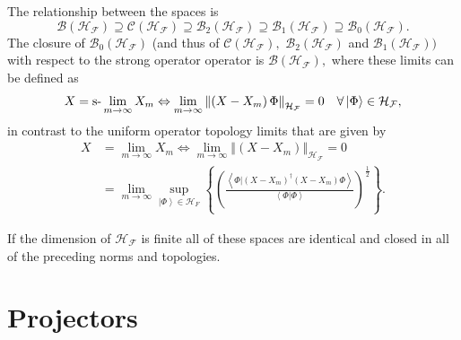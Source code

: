 \documentclass[aps,preprint]{revtex4}%
\begin{document}
The relationship between the spaces is
\begin{equation}
\mathcal{B}\left(  \mathcal{H}_{\mathcal{F}}\right)  \supseteq\mathcal{C}%
\left(  \mathcal{H}_{\mathcal{F}}\right)  \supseteq\mathcal{B}_{2}\left(
\mathcal{H}_{\mathcal{F}}\right)  \supseteq\mathcal{B}_{1}\left(
\mathcal{H}_{\mathcal{F}}\right)  \supseteq\mathcal{B}_{0}\left(
\mathcal{H}_{\mathcal{F}}\right)  .
\end{equation}
The closure of $\mathcal{B}_{0}\left(  \mathcal{H}_{\mathcal{F}}\right)  $
(and thus of $\mathcal{C}\left(  \mathcal{H}_{\mathcal{F}}\right)  ,$
$\mathcal{B}_{2}\left(  \mathcal{H}_{\mathcal{F}}\right)  $ and $\mathcal{B}%
_{1}\left(  \mathcal{H}_{\mathcal{F}}\right)  )$ with respect to the strong
operator operator is $\mathcal{B}\left(  \mathcal{H}_{\mathcal{F}}\right)  ,$
where these limits can be defined as
\begin{equation}
X=\text{\textrm{s-}}\lim_{m\rightarrow\infty}X_{m}\Leftrightarrow
\lim_{m\rightarrow\infty}\left\Vert \left(  X-X_{m}\right)  \Phi\right\Vert
_{\mathcal{H}_{\mathcal{F}}}=0\quad\forall\left\vert \Phi\right\rangle
\in\mathcal{H}_{\mathcal{F}},
\end{equation}
in contrast to the uniform operator topology limits that are given by%
\begin{align}
X  &  =\lim_{m\rightarrow\infty}X_{m}\Leftrightarrow\lim_{m\rightarrow\infty
}\left\Vert \left(  X-X_{m}\right)  \right\Vert _{\mathcal{H}_{\mathcal{F}}%
}=0\nonumber\\
&  =\lim_{m\rightarrow\infty}\sup_{\left\vert \Phi\right\rangle \in
\mathcal{H}_{F}}\left\{  \left(  \frac{\left\langle \left.  \Phi\right\vert
\left(  X-X_{m}\right)  ^{\dagger}\left(  X-X_{m}\right)  \Phi\right\rangle
}{\left\langle \left.  \Phi\right\vert \Phi\right\rangle }\right)  ^{\frac
{1}{2}}\right\}  .
\end{align}


If the dimension of $\mathcal{H}_{\mathcal{F}}$ is finite all of these spaces
are identical and closed in all of the preceding norms and topologies.

\section{Projectors \label{Projection}}
\end{document}
